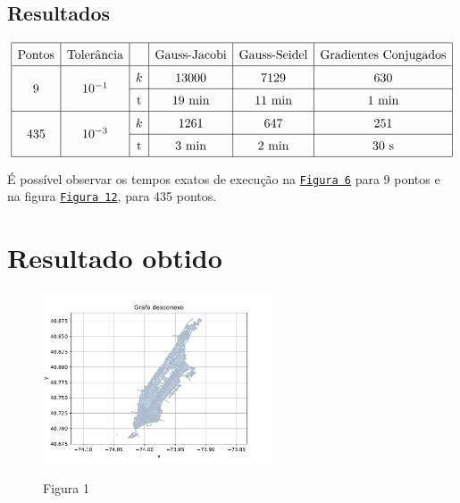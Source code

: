 \documentclass{article}
\begin{document}
    \hypertarget{3}{}
    \hypertarget{7}{}

    \subsection{Resultados}

    \[\renewcommand{\arraystretch}{1.5}
    \begin{array}{|c|c|c|c|c|c|}
        \hline
        \text{Pontos} & \text{Tolerância} & & \text{Gauss-Jacobi} & \text{Gauss-Seidel} & \text{Gradientes Conjugados}\\
        \hline
        \smash{\raisebox{-.3cm}{9}} & \smash{\raisebox{-.3cm}{$10^{-1}$}} & k & 13000 & 7129 & 630\\
        \cline{3-6}
        & & \text{t} & 19\text{ min} & 11\text{ min} & 1\text{ min}\\
        \hline
        \smash{\raisebox{-.3cm}{435}} & \smash{\raisebox{-.3cm}{$10^{-3}$}} & k & 1261 & 647 & 251\\
        \cline{3-6}
        & & \text{t} & 3\text{ min} & 2\text{ min} & 30\text{ s}\\
        \hline
    \end{array}\]

    É possível observar os tempos exatos de execução na \hyperlink{4}{\texttt{Figura 6}} para 9 pontos e na figura \hyperlink{8}{\texttt{Figura 12}}, para 435 pontos.

    \section{Resultado obtido}

    \begin{figure}[ht]
        \centering
        \includegraphics[width=0.6\textwidth, trim={0 .3cm 0 .9cm},clip]{../figs/fig1.pdf}
        
        Figura 1
    \end{figure}
\end{document}
